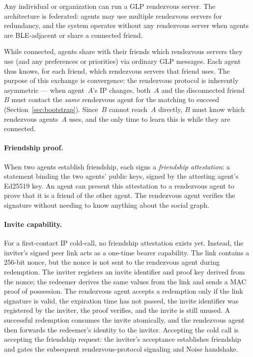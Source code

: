 Any individual or organization can run a GLP rendezvous server.  The architecture is federated: agents may use multiple rendezvous servers for redundancy, and the system operates without any rendezvous server when agents are BLE-adjacent or share a connected friend.

While connected, agents share with their friends which rendezvous servers they use (and any preferences or priorities) via ordinary GLP messages.  Each agent thus knows, for each friend, which rendezvous servers that friend uses.  The purpose of this exchange is convergence: the rendezvous protocol is inherently asymmetric --- when agent~$A$'s IP changes, both~$A$ and the disconnected friend~$B$ must contact the \emph{same} rendezvous agent for the matching to succeed (Section~\ref{sec:bootstrap}).  Since~$B$ cannot reach~$A$ directly, $B$ must know which rendezvous agents~$A$ uses, and the only time to learn this is while they are connected.    
    
\paragraph{Friendship proof.}
\label{sec:friendship-proof}
When two agents establish friendship, each signs a \emph{friendship attestation}: a statement binding the two agents' public keys, signed by the attesting agent's Ed25519 key.  An agent can present this attestation to a rendezvous agent to prove that it is a friend of the other agent.  The rendezvous agent verifies the signature without needing to know anything about the social graph.

\paragraph{Invite capability.}
\label{sec:invite-capability}
For a first-contact IP cold-call, no friendship attestation exists yet.  Instead, the inviter's signed peer link acts as a one-time bearer capability.  The link contains a 256-bit nonce, but the nonce is not sent to the rendezvous agent during redemption.  The inviter registers an invite identifier and proof key derived from the nonce; the redeemer derives the same values from the link and sends a MAC proof of possession.  The rendezvous agent accepts a redemption only if the link signature is valid, the expiration time has not passed, the invite identifier was registered by the inviter, the proof verifies, and the invite is still unused.  A successful redemption consumes the invite atomically, and the rendezvous agent then forwards the redeemer's identity to the inviter.  Accepting the cold call is accepting the friendship request: the inviter's acceptance establishes friendship and gates the subsequent rendezvous-protocol signaling and Noise handshake.

